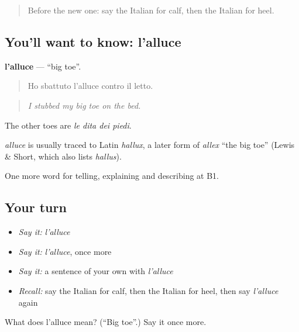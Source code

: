 \label{lesson:IT-C481-alluce}



\begin{quote}
Before the new one: say the Italian for calf, then the Italian for heel.
\end{quote}

\subsection*{You'll want to know: l'alluce}
\textbf{l'alluce} — \textquotedblleft{}big toe\textquotedblright{}.

\begin{quote}
Ho sbattuto l'alluce contro il letto.
\end{quote}

\begin{quote}
\emph{I stubbed my big toe on the bed.}
\end{quote}

The other toes are \emph{le dita dei piedi}.

\begin{cousinweb}
\emph{alluce} is usually traced to Latin \emph{hallux}, a later form of \emph{allex} \textquotedblleft{}the big toe\textquotedblright{} (Lewis \& Short, which also lists \emph{hallus}).
\end{cousinweb}

\begin{grammarlens}[title={What you've built}]
One more word for telling, explaining and describing at B1.
\end{grammarlens}

\subsection*{Your turn}
\begin{itemize}
\raggedright
  \item \emph{Say it:} \emph{l'alluce}
  \item \emph{Say it:} \emph{l'alluce}, once more
  \item \emph{Say it:} a sentence of your own with \emph{l'alluce}
  \item \emph{Recall:} say the Italian for calf, then the Italian for heel, then say \emph{l'alluce} again
\end{itemize}

\begin{tcolorbox}[breakable,colback=teal!4,colframe=teal!35!black,title={Before you move on}]
What does l'alluce mean? (\textquotedblleft{}Big toe\textquotedblright{}.) Say it once more.
\end{tcolorbox}

